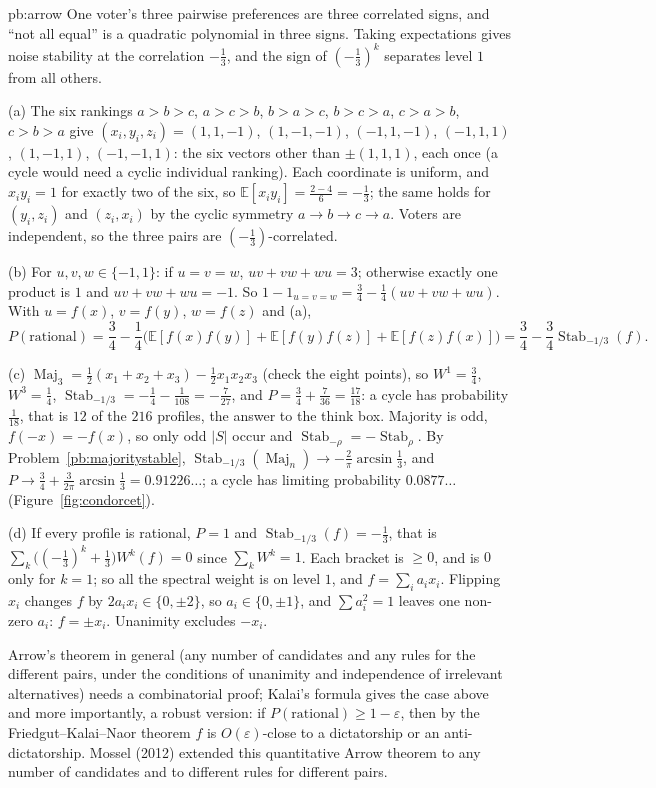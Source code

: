 \begin{solution}{pb:arrow}
\idea One voter's three pairwise preferences are three correlated signs, and ``not all equal'' is a quadratic polynomial in three
signs. Taking expectations gives noise stability at the correlation $-\frac13$, and the sign of $(-\frac13)^k$ separates level $1$ from all others.

\writeup (a) The six rankings $a{>}b{>}c$, $a{>}c{>}b$, $b{>}a{>}c$, $b{>}c{>}a$, $c{>}a{>}b$, $c{>}b{>}a$ give $(x_i,y_i,z_i)=(1,1,-1)$, $(1,-1,-1)$, $(-1,1,-1)$, $(-1,1,1)$,
$(1,-1,1)$, $(-1,-1,1)$: the six vectors other than $\pm(1,1,1)$, each once (a cycle would need a cyclic individual ranking). Each coordinate is
uniform, and $x_iy_i=1$ for exactly two of the six, so $\mathbb E[x_iy_i]=\frac{2-4}6=-\frac13$; the same holds for $(y_i,z_i)$ and $(z_i,x_i)$ by the cyclic
symmetry $a\to b\to c\to a$. Voters are independent, so the three pairs are $(-\frac13)$-correlated.

(b) For $u,v,w\in\{-1,1\}$: if $u=v=w$, $uv+vw+wu=3$; otherwise exactly one product is $1$ and $uv+vw+wu=-1$. So
$1-1_{u=v=w}=\frac34-\frac14(uv+vw+wu)$. With $u=f(x)$, $v=f(y)$, $w=f(z)$ and (a),
\[
P(\text{rational})=\frac34-\frac14\bigl(\mathbb E[f(x)f(y)]+\mathbb E[f(y)f(z)]+\mathbb E[f(z)f(x)]\bigr)=\frac34-\frac34\operatorname{Stab}_{-1/3}(f).
\]

(c) $\operatorname{Maj}_3=\frac12(x_1+x_2+x_3)-\frac12x_1x_2x_3$ (check the eight points), so $W^1=\frac34$, $W^3=\frac14$, $\operatorname{Stab}_{-1/3}=-\frac14-\frac1{108}=-\frac7{27}$, and
$P=\frac34+\frac7{36}=\frac{17}{18}$: a cycle has probability $\frac1{18}$, that is $12$ of the $216$ profiles, the answer to the think box. Majority is odd,
$f(-x)=-f(x)$, so only odd $|S|$ occur and $\operatorname{Stab}_{-\rho}=-\operatorname{Stab}_\rho$. By Problem~\ref{pb:majoritystable}, $\operatorname{Stab}_{-1/3}(\operatorname{Maj}_n)\to-\frac2\pi\arcsin\frac13$, and
$P\to\frac34+\frac3{2\pi}\arcsin\frac13=0.91226\ldots$; a cycle has limiting probability $0.0877\ldots$ (Figure~\ref{fig:condorcet}).

(d) If every profile is rational, $P=1$ and $\operatorname{Stab}_{-1/3}(f)=-\frac13$, that is $\sum_k\bigl((-\frac13)^k+\frac13\bigr)W^k(f)=0$ since $\sum_kW^k=1$. Each bracket is
$\ge0$, and is $0$ only for $k=1$; so all the spectral weight is on level $1$, and $f=\sum_ia_ix_i$. Flipping $x_i$ changes $f$ by $2a_ix_i\in\{0,\pm2\}$, so
$a_i\in\{0,\pm1\}$, and $\sum a_i^2=1$ leaves one non-zero $a_i$: $f=\pm x_i$. Unanimity excludes $-x_i$.

\leads Arrow's theorem in general (any number of candidates and any rules for the different pairs, under the conditions of
unanimity and independence of irrelevant alternatives) needs a combinatorial proof; Kalai's formula gives the case above and
more importantly, a robust version: if $P(\text{rational})\ge1-\varepsilon$, then by the Friedgut--Kalai--Naor theorem $f$ is $O(\varepsilon)$-close to a
dictatorship or an anti-dictatorship. Mossel (2012) extended this quantitative Arrow theorem to any number of candidates and to different rules for different
pairs.
\end{solution}

